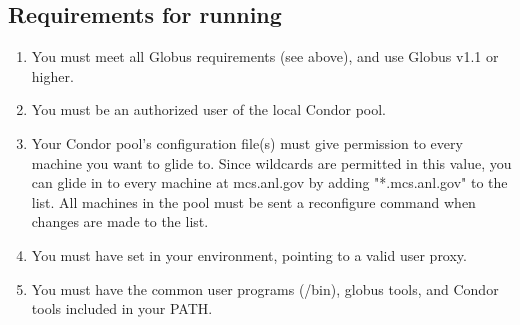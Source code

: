 \subsection{Requirements for running }
\begin{enumerate}
\item You must meet all Globus requirements (see above), and use Globus v1.1 or higher.

\item You must be an authorized user of the local Condor pool.

\item Your Condor pool's configuration file(s) must give 
  permission to every machine you want to glide to. Since wildcards
  are permitted in this value, you can glide in to every machine at
  mcs.anl.gov by adding "*.mcs.anl.gov" to the  list.
  All machines in the pool must be sent a reconfigure command when
  changes are made to the  list.

\item You must have  set in your environment, pointing to a
  valid user proxy.

\item You must have the common user programs (/bin), globus tools, and Condor
  tools included in your PATH.
\end{enumerate}

